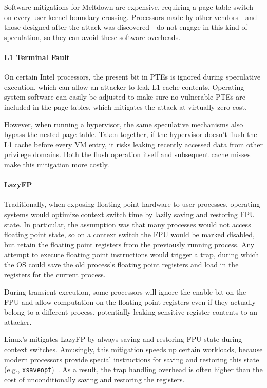 Software mitigations for Meltdown are expensive, requiring a page table
switch on every user-kernel boundary crossing.  Processors made by other
vendors---and those designed after the attack was discovered---do not engage in
this kind of speculation, so they can avoid these software overheads.

\paragraph{L1 Terminal Fault~\cite{weisse:foreshadow-ng}}
On certain Intel processors, the present bit in PTEs is ignored during speculative execution, which can
allow an attacker to leak L1 cache contents.
Operating system software can easily be adjusted to make sure no vulnerable PTEs are included in the page tables, which mitigates the attack at virtually zero cost.

However, when running a hypervisor, the same speculative mechanisms also bypass
the nested page table.
Taken together, if the hypervisor doesn't flush the L1 cache before every VM entry, it risks leaking recently accessed data from other privilege domains.
Both the flush operation itself and subsequent cache misses make this mitigation more costly.

\paragraph{LazyFP~\cite{stecklina:lazyfp}}
Traditionally, when exposing floating point hardware to user processes, operating systems would optimize context switch time by lazily saving and restoring FPU state.
In particular, the assumption was that many processes would not access floating point state, so on a context switch the FPU would be marked disabled, but retain the floating point registers from the previously running process.
Any attempt to execute floating point instructions would trigger a trap, during which the OS could save the old process's floating point registers and load in the registers for the current process.

During transient execution, some processors will ignore the enable bit on the FPU and allow computation on the floating point registers even if they actually belong to a different process, potentially leaking sensitive register contents to an attacker.

Linux's mitigates LazyFP by always saving and restoring FPU state during context
switches.  Amusingly, this mitigation speeds up certain workloads,
because modern processors provide special instructions for saving and
restoring this state (e.g., \texttt{xsaveopt})~\cite{lutomirski:lazyfp-perf}. As
a result, the trap handling overhead is often higher than the cost of unconditionally saving and restoring the registers.

